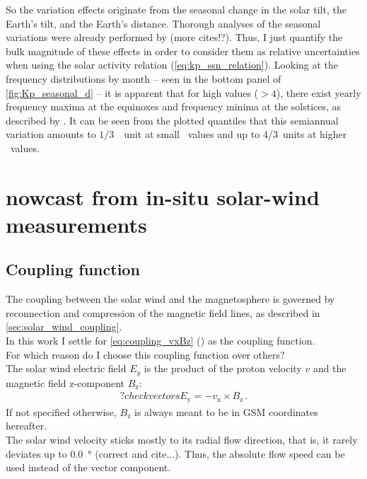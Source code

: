 So the \Kp{} variation effects originate from the seasonal change in the solar tilt, the Earth's tilt, and the Earth's distance. Thorough analyses of the seasonal variations were already performed by \citep{Cortie1912} (more cites!?). Thus, I just quantify the bulk magnitude of these effects in order to consider them as relative uncertainties when using the solar activity relation (\ref{eq:kp_ssn_relation}). Looking at the \Kp{} frequency distributions by month -- seen in the bottom panel of \autoref{fig:Kp_seasonal_d} -- it is apparent that for high \Kp{} values ($>4$), there exist yearly frequency maxima at the equinoxes and frequency minima at the solstices, as described by \citep{Cortie1912}. It can be seen from the plotted quantiles that this semiannual variation amounts to $1/3$~\Kp~unit at small \Kp~values and up to 4/3~units at higher \Kp~values.


\section{\Kp{} nowcast from in-situ solar-wind measurements}
\label{sec:kp_nowcast}

\subsection{Coupling function}

The coupling between the solar wind and the magnetosphere is governed by reconnection and compression of the magnetic field lines, as described in \autoref{sec:solar_wind_coupling}.\\

In this work I settle for \autoref{eq:coupling_vxBz} (\vBz{}) as the coupling function.\\
For which reason do I choose this coupling function over others?\\

The solar wind electric field $E_y$ is the product of the proton velocity $v$ and the magnetic field z-component $B_\text{z}$:
\begin{align}
	?check vectors  E_\text{y} = -v_\text{x} \times B_\text{z}\,.
\end{align}
If not specified otherwise, $B_\text{z}$ is always meant to be in GSM coordinates hereafter.\\


The solar wind velocity sticks mostly to its radial flow direction, that is, it rarely deviates up to \SI{0.0}{\degree} (correct and cite...). Thus, the absolute flow speed can be used instead of the vector component.\\

